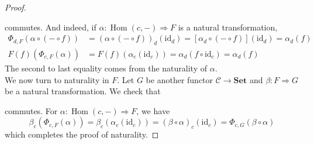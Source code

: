 \documentclass{article}
\newcommand{\id}{\mathrm{id}}
\newcommand{\cat}{\mathcal{C}}
\newcommand{\Set}{\mathbf{Set}}
\DeclareMathOperator{\Hom}{Hom}
\DeclareMathOperator{\Nat}{Nat}
\theoremstyle{plain}
\theoremstyle{definition}
\theoremstyle{remark}
\begin{document}
\begin{proof}
    \begin{center}
    \end{center}
    commutes. And indeed, if $\alpha : \Hom(c,-)\Rightarrow F$ is a natural transformation,
    \begin{align*}
        \Phi_{d,F}(\alpha \circ (- \circ f)) & = (\alpha \circ (-\circ f))_d (\id_d) = [\alpha_d \circ (- \circ f)] (\id_d) = \alpha_d (f) \\
        F(f)(\Phi_{c,F}(\alpha)) & = F(f)(\alpha_c(\id_c)) = \alpha_d(f\circ \id_c) = \alpha_d(f)
    \end{align*}
    The second to last equality comes from the naturality of $\alpha$. \\
    We now turn to naturality in $F$. Let $G$ be another functor $\cat \to \Set$ and $\beta : F \Rightarrow G$ be a natural transformation. We check that
    \begin{center}
    \end{center}
    commutes. For $\alpha : \Hom(c,-) \Rightarrow F$, we have
    \[\beta_c (\Phi_{c,F}(\alpha)) = \beta_c(\alpha_c(\id_c)) = (\beta \circ \alpha)_c (\id_c) = \Phi_{c,G}(\beta \circ \alpha)\]
    which completes the proof of naturality.
\end{proof}
\newpage
\end{document}
